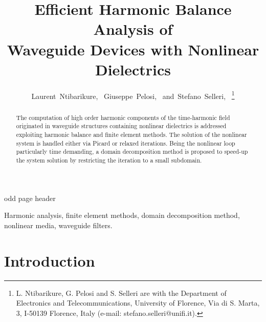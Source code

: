 \documentclass[journal]{IEEEtran}
\begin{document}

%
\title{Efficient Harmonic Balance Analysis of \\ Waveguide Devices with Nonlinear Dielectrics}
%
%
\author{ Laurent~Ntibarikure,~
		Giuseppe~Pelosi,~
        and~Stefano~Selleri,~
        \thanks{ L. Ntibarikure, G. Pelosi and S. Selleri are with the
        Department of Electronics and Telecommunications, University of 
        Florence, Via di S. Marta, 3, I-50139 Florence, Italy (e-mail:
        stefano.selleri@unifi.it). }}
 
%
{odd page header}

\maketitle


\begin{abstract}
The computation of high order harmonic components of the
time-harmonic field originated in waveguide structures containing
nonlinear dielectrics is addressed exploiting 
harmonic balance and finite element methods. The solution
of the nonlinear system is handled either via Picard or relaxed iterations. 
Being the nonlinear loop particularly time demanding, a domain
decomposition method is proposed to speed-up the system solution by restricting
the iteration to a small subdomain.

\end{abstract}
\begin{IEEEkeywords}
Harmonic analysis, finite element methods, domain decomposition method,
nonlinear media, waveguide filters.
\end{IEEEkeywords}




\IEEEpeerreviewmaketitle



\section{Introduction}
\end{document}
